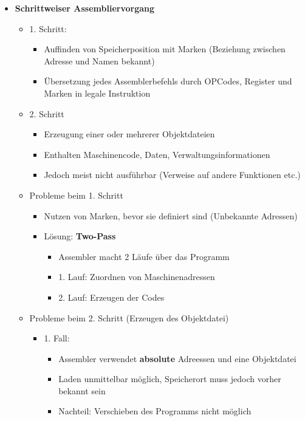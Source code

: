 \begin{itemize}
        \item \textbf{Schrittweiser Assembliervorgang}
            \begin{itemize}
                \item 1. Schritt:
                    \begin{itemize}
                        \item Auffinden von Speicherposition mit Marken (Beziehung zwischen Adresse und Namen bekannt)
                        \item Übersetzung jedes Assemblerbefehls durch OPCodes, Register und Marken in legale Instruktion
                    \end{itemize}
                \item 2. Schritt
                    \begin{itemize}
                        \item Erzeugung einer oder mehrerer Objektdateien
                        \item Enthalten Maschinencode, Daten, Verwaltungsinformationen
                        \item Jedoch meist nicht ausführbar (Verweise auf andere Funktionen etc.)
                    \end{itemize}
                \item Probleme beim 1. Schritt
                    \begin{itemize}
                        \item Nutzen von Marken, bevor sie definiert sind (Unbekannte Adressen)
                        \item Lösung: \textbf{Two-Pass}
                            \begin{itemize}
                                \item Assembler macht 2 Läufe über das Programm
                                \item 1. Lauf: Zuordnen von Maschinenadressen
                                \item 2. Lauf: Erzeugen der Codes
                            \end{itemize}
                    \end{itemize}
                \item Probleme beim 2. Schritt (Erzeugen des Objektdatei)
                    \begin{itemize}
                        \item 1. Fall:
                            \begin{itemize}
                                \item Assembler verwendet \textbf{absolute} Adreessen und eine Objektdatei
                                \item Laden unmittelbar möglich, Speicherort muss jedoch vorher bekannt sein
                                \item Nachteil: Verschieben des Programms nicht möglich
                            \end{itemize}


\end{itemize}
\end{itemize}
\end{itemize}

